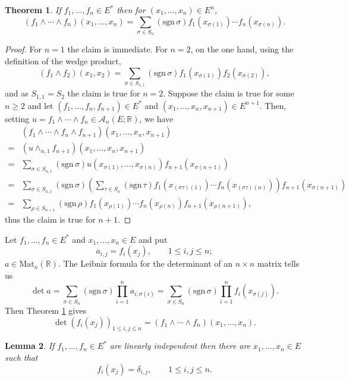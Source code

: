 \documentclass{article}
\newcommand{\sgn}{\mathrm{sgn}\,}
\newcommand{\Mat}{\mathrm{Mat}}
\newtheorem{theorem}{Theorem}
\newtheorem{lemma}[theorem]{Lemma}
\theoremstyle{definition}
\begin{document}
\begin{theorem}
If $f_1,\ldots,f_n \in E^*$ then for $(x_1,\ldots,x_n) \in E^n$,
\[
(f_1 \wedge \cdots \wedge f_n)(x_1,\ldots,x_n) = \sum_{\sigma \in S_n} (\sgn \sigma) f_1(x_{\sigma(1)}) \cdots f_n(x_{\sigma(n)}).
\]
\label{nwedge}
\end{theorem}
\begin{proof}
For $n=1$ the claim is immediate. For $n=2$,
on the one hand, using the definition of the wedge product,
\[
(f_1 \wedge f_2)(x_1,x_2) =
\sum_{\sigma \in S_{1,1}} (\sgn \sigma) f_1(x_{\sigma(1)}) f_2(x_{\sigma(2)}),
\]
and as $S_{1,1}=S_2$ the claim is true for $n=2$. 
Suppose the claim is true for some $n \geq 2$ 
and let $(f_1,\ldots,f_n,f_{n+1}) \in E^*$ and $(x_1,\ldots,x_n,x_{n+1}) \in E^{n+1}$. Then, setting
$u=f_1 \wedge \cdots \wedge f_n \in \mathscr{A}_n(E;\mathbb{R})$, we have
\[
\begin{split}
&(f_1 \wedge \cdots \wedge f_n \wedge f_{n+1})(x_1,\ldots,x_n,x_{n+1})\\
=&(u \wedge_{n,1} f_{n+1})(x_1,\ldots,x_n,x_{n+1})\\
=&\sum_{\sigma \in S_{n,1}} (\sgn \sigma) u(x_{\sigma(1)},\ldots,x_{\sigma(n)}) f_{n+1}(x_{\sigma(n+1)})\\
=&\sum_{\sigma \in S_{n,1}} (\sgn \sigma) \left( \sum_{\tau \in S_n} (\sgn \tau) f_1(x_{(\sigma \tau)(1)}) \cdots f_n(x_{(\sigma \tau)(n)}) \right) f_{n+1}(x_{\sigma(n+1)})\\
=&\sum_{\rho \in S_{n+1}} (\sgn \rho) f_1(x_{\rho(1)}) \cdots
f_n(x_{\rho(n)}) f_{n+1}(x_{\rho(n+1)}),
\end{split}
\]
thus the claim is true for $n+1$. 
\end{proof}




Let $f_1,\ldots,f_n \in E^*$ and $x_1,\ldots,x_n \in E$ and put
\[
a_{i,j}=f_i(x_j), \qquad 1 \leq i,j \leq n;
\]
$a \in \Mat_n(\mathbb{R})$.
The Leibniz formula for the determinant of an $n \times n$ matrix tells us
\[
\det a=\sum_{\sigma \in S_n} (\sgn \sigma) \prod_{i=1}^n a_{i,\sigma(i)}
=\sum_{\sigma \in S_n} (\sgn \sigma) \prod_{i=1}^n f_i(x_{\sigma(j)}).
\]
Then Theorem \ref{nwedge} gives
\[
\det (f_i(x_j))_{1 \leq i,j \leq n} = (f_1 \wedge \cdots \wedge f_n)(x_1,\ldots,x_n).
\]



\begin{lemma}
If $f_1,\ldots,f_n \in E^*$ are linearly independent then there are
$x_1,\ldots,x_n \in E$ such that
\[
f_i(x_j) = \delta_{i,j},\qquad 1 \leq i,j \leq n.
\]
\label{dualset}
\end{lemma}
\end{document}
